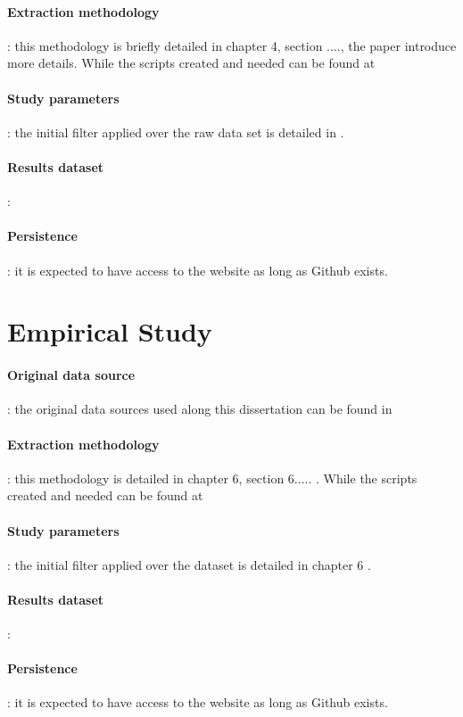 \documentclass[a4paper, 12pt]{book}
\begin{document}
\paragraph{Extraction methodology}: this methodology is briefly detailed in chapter 4, section ...., the paper introduce more details. While the scripts created and needed can be found at  
\paragraph{Study parameters}: the initial filter applied over the raw data set is detailed in .
\paragraph{Results dataset}:
\paragraph{Persistence}: it is expected to have access to the website as long as Github exists. 

\section{Empirical Study}
\label{sec:replicabilityEmpirical}
\paragraph{Original data source}:  the original data sources used along this dissertation can be found in 
\paragraph{Extraction methodology}: this methodology is detailed in chapter 6, section 6..... . While the scripts created and needed can be found at 
\paragraph{Study parameters}: the initial filter applied over the dataset is detailed in chapter 6 .
\paragraph{Results dataset}:
\paragraph{Persistence}:  it is expected to have access to the website as long as Github exists. 
\end{document}
